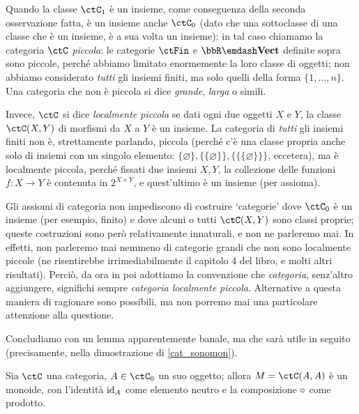 \begin{definition}

	Quando la classe \(\ctC_1\) è un insieme, come conseguenza della seconda osservazione fatta, è un insieme anche \(\ctC_0\) (dato che una sottoclasse di una classe che è un insieme, è a sua volta un insieme): in tal caso chiamamo la categoria \(\ctC\) \emph{piccola}: le categorie \(\ctFin\) e \(\bbR\emdash\ctVect\) definite sopra sono piccole, perché abbiamo limitato enormemente la loro classe di oggetti; non abbiamo considerato \emph{tutti} gli insiemi finiti, ma solo quelli della forma \(\{1,\dots,n\}\). Una categoria che non è piccola si dice \emph{grande}, \emph{larga} o simili.

	Invece, \(\ctC\) si dice \emph{localmente piccola} se dati ogni due oggetti \(X\) e \(Y\), la classe \(\Hom{\ctC}(X,Y)\) di morfismi da \(X\) a \(Y\) è un insieme. La categoria di \emph{tutti} gli insiemi finiti non è, strettamente parlando, piccola (perché c'è una classe propria anche solo di insiemi con un singolo elemento: \(\{\varnothing\},\{\{\varnothing\}\}, \{\{\{\varnothing\}\}\}\), eccetera), ma è localmente piccola, perché fissati due insiemi \(X,Y\), la collezione delle funzioni \(f : X\to Y\) è contenuta in \(2^{X\times Y}\), e quest'ultimo è un insieme (per assioma).
\end{definition}
\begin{remark}
	Gli assiomi di categoria non impediscono di costruire `categorie' dove \(\ctC_0\) è un insieme (per esempio, finito) e dove alcuni o tutti \(\Hom{\ctC}(X,Y)\) sono classi proprie; queste costruzioni sono però relativamente innaturali, e non ne parleremo mai. In effetti, non parleremo mai nemmeno di categorie grandi che non sono localmente piccole (ne risentirebbe irrimediabilmente il capitolo 4 del libro, e molti altri risultati). Perciò, da ora in poi adottiamo la convenzione che \emph{categoria}, senz'altro aggiungere, significhi sempre \emph{categoria localmente piccola}. Alternative a questa maniera di ragionare sono possibili, ma non porremo mai una particolare attenzione alla questione.
\end{remark}
Concludiamo con un lemma apparentemente banale, ma che sarà utile in seguito (precisamente, nella dimostrazione di \ref{cat_sonomon}).
\begin{lemma}\label{lem_end_monoide}
	Sia \(\ctC\) una categoria, \(A\in\ctC_0\) un suo oggetto; allora \(M=\Hom{\ctC}(A,A)\) è un monoide, con l'identità \(\mathrm{id}_A\) come elemento neutro e la composizione \(\circ\) come prodotto.
\end{lemma}
